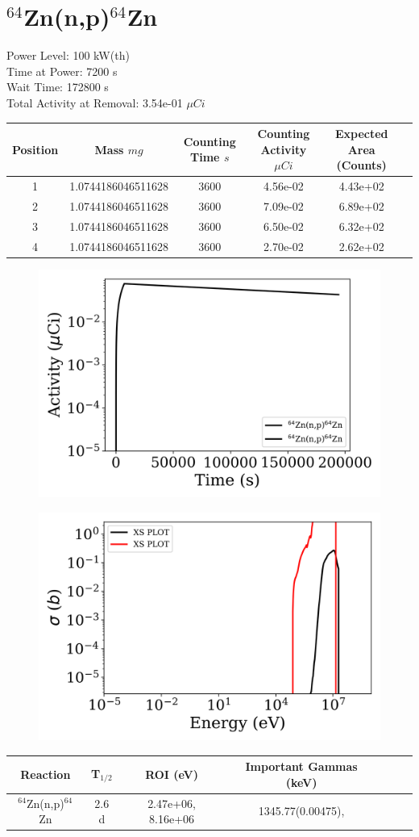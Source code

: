 \newpage

\section*{ $^{64}$Zn(n,p)$^{64}$Zn }

Power Level: 100 kW(th) \\
Time at Power: 7200 s \\
Wait Time: 172800 s \\
Total Activity at Removal: 3.54e-01 $\mu Ci$

\begin{table}[h]
\centering
\begin{tabular}{ |c|c|c|c|c|c| }
 \hline
 Position & Mass $mg$ & Counting Time $s$ & Counting Activity $\mu Ci$ & Expected Area (Counts) \\
 \hline 
 1 & 1.0744186046511628 & 3600 & 4.56e-02 & 4.43e+02\\ 
\hline
 2 & 1.0744186046511628 & 3600 & 7.09e-02 & 6.89e+02\\ 
\hline
 3 & 1.0744186046511628 & 3600 & 6.50e-02 & 6.32e+02\\ 
\hline
 4 & 1.0744186046511628 & 3600 & 2.70e-02 & 2.62e+02\\ 
\hline
\end{tabular}
\end{table}

\begin{figure}[!ht]
   \centering
   \includegraphics[width=.4\textwidth]{source/plot/Zn-64(n,p)Cu-64_wisconsin1.png} 

\end{figure}

\begin{figure}[!ht]
   \centering
   \includegraphics[width=.4\textwidth]{source/plot/Zn-64(n,p)Cu-64.png} 

\end{figure}

\begin{table}[h]
\centering
\begin{tabular}{ |c|c|c|c|c|c|c| }
 \hline
 Reaction & T$_{1/2}$ & ROI (eV) & Important Gammas (keV) \\
 \hline 
 $^{64}$Zn(n,p)$^{64}$Zn &  2.6 d & 2.47e+06, 8.16e+06 & 1345.77(0.00475),  \\ 
\hline
\end{tabular}
\end{table}
